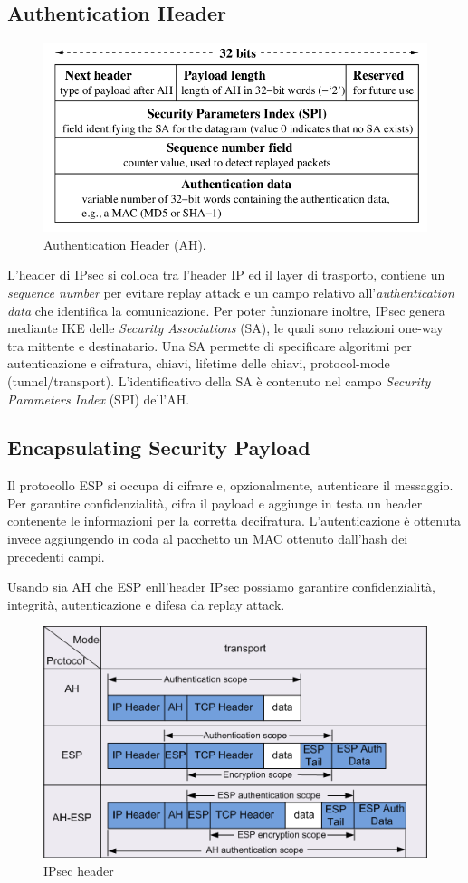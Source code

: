 \documentclass[a4paper, 11pt, twoside, openright, fleqn]{report}
\begin{document}
\subsection{Authentication Header}
\begin{figure}[htp]
	\centering
	\includegraphics[width=.8\textwidth]{images/AH}
	\caption{Authentication Header (AH).}
\end{figure}
L'header di IPsec si colloca tra l'header IP ed il layer di trasporto, contiene un \emph{sequence number} per evitare replay attack e un campo relativo all'\emph{authentication data} che identifica la comunicazione. Per poter funzionare inoltre, IPsec genera mediante IKE delle \emph{Security Associations} (SA), le quali sono relazioni one-way tra mittente e destinatario. Una SA permette di specificare algoritmi per autenticazione e cifratura, chiavi, lifetime delle chiavi, protocol-mode (tunnel/transport). L'identificativo della SA è contenuto nel campo \emph{Security Parameters Index} (SPI) dell'AH.

\subsection{Encapsulating Security Payload}
Il protocollo ESP si occupa di cifrare e, opzionalmente, autenticare il messaggio. Per garantire confidenzialità, cifra il payload e aggiunge in testa un header contenente le informazioni per la corretta decifratura. L'autenticazione è ottenuta invece aggiungendo in coda al pacchetto un MAC ottenuto dall'hash dei precedenti campi.

Usando sia AH che ESP enll'header IPsec possiamo garantire confidenzialità, integrità, autenticazione e difesa da replay attack.
\begin{figure}[htp]
	\centering
	\includegraphics[width=.95\textwidth]{images/IPsecHeader}
	\caption{IPsec header}
\end{figure}
\end{document}
